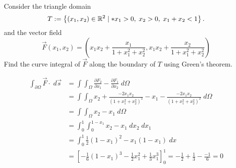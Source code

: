 \documentclass[11pt]{article}
\begin{document}
\begin{exercise}
    Consider the triangle domain 
    \[
        T := \left\{ (x_1,x_2) \in \bbR^{2} \suchthat* x_1 > 0, \; x_2 > 0, \; x_1+x_2 < 1 \right\}.
    \]
    and the vector field 
    \[
        \vec F(x_1,x_2) = \left( x_1x_2 + \frac{x_1}{1+x_1^2+x_2^2}, x_1x_2 + \frac{x_2}{1+x_1^2+x_2^2} \right)
    \]
    Find the curve integral of $\vec F$ along the boundary of $T$ using Green's theorem.
\end{exercise}
\begin{solution}
\begin{align*}
    \int_{\partial \Omega} \vec{F} \cdot \; d \vec{s}
    &= 
    \int\int_{\Omega} \frac{\partial F_2}{\partial x_1} - \frac{\partial F_1}{\partial x_2}\; d \Omega
    \\
    &= 
    \int\int_{\Omega} x_2 + \frac{-2x_1x_2}{(1+x_1^ 2 + x_2^ 2)^2} - x_1 - \frac{-2x_1x_2}{(1+x_1^ 2 + x_2^ 2)^2} \; d \Omega
    \\
    &= 
    \int\int_{\Omega} x_2  - x_1\; d \Omega
    \\
    &= 
    \int_0^ 1\int_0^ {1-x_1} x_2 - x_1 \;dx_2\;dx_1
    \\
    &= 
    \int_0^ 1 \frac{1}{2}(1-x_1)^ 2 - x_1(1-x_1) \;d x
    \\
    &= 
    \left[ -\frac{1}{6}(1-x_1)^ 3 - \frac{1}{2} x_1^2 + \frac{1}{3}x_1^ 3 \right]_0^1 = -\frac{1}{2} + \frac{1}{3} - \frac{-1}{6} = 0
\end{align*}
\end{solution}
\end{document}
